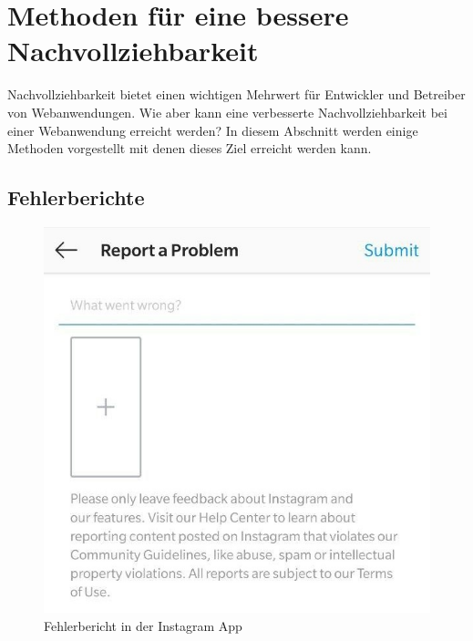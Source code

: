

\section{Methoden für eine bessere Nachvollziehbarkeit}
\label{sec:methoden}

Nachvollziehbarkeit bietet einen wichtigen Mehrwert für Entwickler und Betreiber von Webanwendungen. Wie aber kann eine verbesserte Nachvollziehbarkeit bei einer Webanwendung erreicht werden? In diesem Abschnitt werden einige Methoden vorgestellt mit denen dieses Ziel erreicht werden kann.

\subsection{Fehlerberichte}

\begin{figure}
\centering
\includegraphics[width=\linewidth]{img/instagram-feedback/instagram-feedback.jpg}
\caption{Fehlerbericht in der Instagram App \cite{Instagram}}
\label{fig:instagram-bug-report}
\end{figure}

